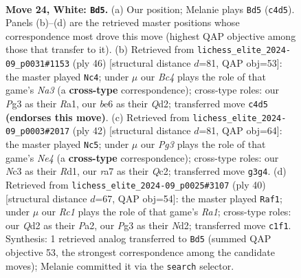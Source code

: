 \documentclass[11pt]{article}
\begin{document}
\clearpage

\begin{figure}[p]\centering
\begin{subfigure}{0.46\textwidth}\centering
\resizebox{\linewidth}{!}{%
\newchessgame
\chessboard[
  setfen={1n2r1k1/r3qpp1/1p1pbn2/4p2p/P1B1P2N/2N3P1/2PQ1P1P/R1R3K1 w - - 9 24},
  showmover=false,
  pgfstyle=straightmove, color=movearrow, markmove={c4-d5}
]}
\caption{}
\end{subfigure}\hfill
\begin{subfigure}{0.46\textwidth}\centering
\resizebox{\linewidth}{!}{%
\newchessgame
\chessboard[
  setfen={r2r2k1/4npp1/1qp4p/pb2p3/1n1PN3/NP2P1P1/3Q1PBP/R1R3K1 w - - 0 24},
  showmover=false,
  pgfstyle=straightmove, color=movearrow, markmove={a3-c4}
]}
\caption{}
\end{subfigure}
\\[4pt]
\begin{subfigure}{0.46\textwidth}\centering
\resizebox{\linewidth}{!}{%
\newchessgame
\chessboard[
  setfen={1r1qr1k1/1pn2pp1/pnp1b2p/4N3/3PN3/PB4P1/1PQ2PP1/3RR1K1 w - - 3 22},
  showmover=false,
  pgfstyle=straightmove, color=movearrow, markmove={e4-c5}
]}
\caption{}
\end{subfigure}\hfill
\begin{subfigure}{0.46\textwidth}\centering
\resizebox{\linewidth}{!}{%
\newchessgame
\chessboard[
  setfen={1k2r2r/pbqn1pb1/1pp5/3pPBp1/3P2N1/2P2R2/PP1NQ1P1/R5K1 w - - 3 21},
  showmover=false,
  pgfstyle=straightmove, color=movearrow, markmove={a1-f1}
]}
\caption{}
\end{subfigure}
\caption{\textbf{Move 24, White: \texttt{Bd5}.} (a) Our position; Melanie plays \texttt{Bd5} (\texttt{c4d5}). Panels (b)--(d) are the retrieved master positions whose correspondence most drove this move (highest QAP objective among those that transfer to it). (b) Retrieved from \texttt{lichess\_elite\_2024-09\_p0031\#1153} (ply 46) [structural distance $d$=81, QAP obj=53]: the master played \texttt{Nc4}; under $\mu$ our \emph{Bc4} plays the role of that game's \emph{Na3} (a \textbf{cross-type} correspondence); cross-type roles: our \emph{P}g3 as their \emph{R}a1, our \emph{b}e6 as their \emph{Q}d2; transferred move \texttt{c4d5} \textbf{(endorses this move)}. (c) Retrieved from \texttt{lichess\_elite\_2024-09\_p0003\#2017} (ply 42) [structural distance $d$=81, QAP obj=64]: the master played \texttt{Nc5}; under $\mu$ our \emph{Pg3} plays the role of that game's \emph{Ne4} (a \textbf{cross-type} correspondence); cross-type roles: our \emph{N}c3 as their \emph{R}d1, our \emph{r}a7 as their \emph{Q}c2; transferred move \texttt{g3g4}. (d) Retrieved from \texttt{lichess\_elite\_2024-09\_p0025\#3107} (ply 40) [structural distance $d$=67, QAP obj=54]: the master played \texttt{Raf1}; under $\mu$ our \emph{Rc1} plays the role of that game's \emph{Ra1}; cross-type roles: our \emph{Q}d2 as their \emph{P}a2, our \emph{P}g3 as their \emph{N}d2; transferred move \texttt{c1f1}. Synthesis: 1 retrieved analog transferred to \texttt{Bd5} (summed QAP objective 53, the strongest correspondence among the candidate moves); Melanie committed it via the \texttt{search} selector.}
\label{fig:thought-m46}
\end{figure}
\end{document}
